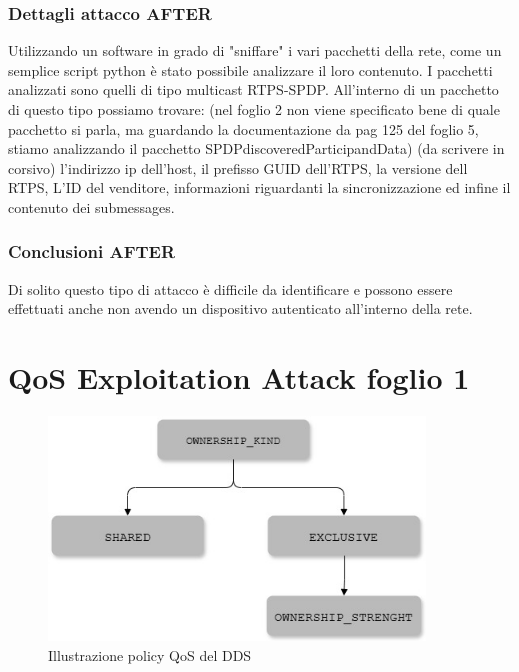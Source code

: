 \subsubsection{Dettagli attacco AFTER}
Utilizzando un software in grado di "sniffare" i vari pacchetti della
rete, come un semplice script python è stato possibile analizzare il loro
contenuto. I pacchetti analizzati sono quelli di tipo multicast RTPS-SPDP.
All'interno di un pacchetto di questo tipo possiamo trovare: (nel foglio 2
non viene specificato bene di quale pacchetto si parla, ma guardando la documentazione
da pag 125 del foglio 5, stiamo analizzando il pacchetto SPDPdiscoveredParticipandData)
(da scrivere in corsivo) l'indirizzo ip dell'host, il prefisso GUID dell'RTPS,
la versione dell RTPS, L'ID del venditore, informazioni riguardanti la sincronizzazione
ed infine il contenuto dei submessages.




\subsubsection{Conclusioni AFTER}
Di solito questo tipo di attacco è difficile da identificare e possono essere
effettuati anche non avendo un dispositivo autenticato all'interno della rete.


\section{QoS Exploitation Attack foglio 1}


%     




\begin{figure}[H]
    \centering
    \includegraphics[width=10cm, keepaspectratio]{img/Policy QoS DDS_2.jpg}
    \caption{Illustrazione policy QoS del DDS}\label{Mappa QoS}
\end{figure}


